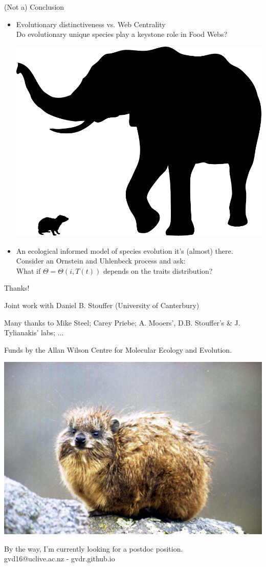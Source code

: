 \documentclass[]{beamer}
\begin{document}
\begin{frame}{(Not a) Conclusion}

\begin{itemize}[<+->]
\item
  Evolutionary distinctiveness vs. Web Centrality\\
  {\small Do evolutionary unique species play a keystone role in Food Webs?}
  \vspace{3 mm}
  
\centering
  \includegraphics[width=0.4\linewidth]{images/hyraxElephant.pdf}
  
  \vspace{3 mm}

\item
  An ecological informed model of species evolution 
  it's (almost) there.\\
  {\small Consider an Ornstein and Uhlenbeck process and ask:\\
  What if $\Theta = \Theta(i,T(t))$ depends on the traits distribution?}
\end{itemize}

\end{frame}

\begin{frame}{Thanks!}

\begin{centering}
\small{
Joint work with  
Daniel B. Stouffer (University of Canterbury)

Many thanks to  
Mike Steel; Carey Priebe; A. Mooers', D.B. Stouffer's \& J. Tylianakis' labs; ...

Funds by the Allan Wilson Centre for Molecular Ecology and Evolution.}

\centering
  \includegraphics[width=0.4\linewidth]{images/hyrax.jpg}

\small{By the way, I'm currently looking for a postdoc position.\\ gvd16@uclive.ac.nz - gvdr.github.io}

\end{centering}

\end{frame}
\end{document}
